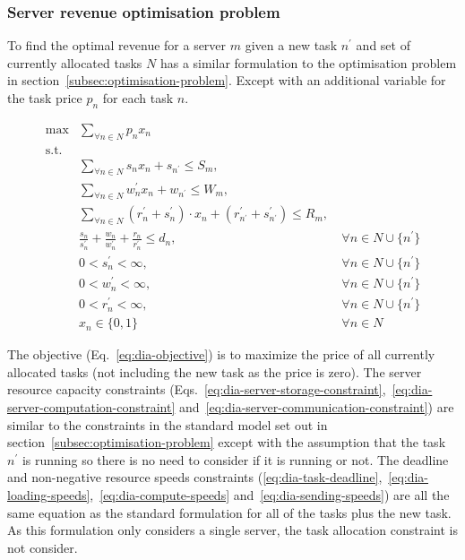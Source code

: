 \subsubsection{Server revenue optimisation problem}\label{subsubsec:decentralised-iterative-problem}
To find the optimal revenue for a server $m$ given a new task $n^{'}$ and set of currently allocated tasks $N$ has a
similar formulation to the optimisation problem in section~\ref{subsec:optimisation-problem}. Except with an additional
variable for the task price $p_n$ for each task $n$.

\begin{align}
    \max & \sum_{\forall n \in N} p_n x_n\label{eq:dia-objective}\\
    \mbox{s.t.} \nonumber \\
    & \sum_{\forall n \in N} s_n x_n + s_{n^{'}} \leq S_m,\label{eq:dia-server-storage-constraint}\\
    & \sum_{\forall n \in N} w^{'}_n x_n + w_{n^{'}} \leq W_m, \label{eq:dia-server-computation-constraint}\\
    & \sum_{\forall n \in N} (r^{'}_n + s^{'}_n) \cdot x_n + (r^{'}_{n^{'}} + s^{'}_{n^{'}}) \leq R_m, \label{eq:dia-server-communication-constraint}\\
    & \frac{s_n}{s^{'}_n} + \frac{w_n}{w^{'}_n} + \frac{r_n}{r^{'}_n} \leq d_n, &~ \forall n \in N \cup \{n^{'}\} \label{eq:dia-task-deadline}\\
    & 0 < s^{'}_n < \infty, &~ \forall{n \in N \cup \{n^{'}\}} \label{eq:dia-loading-speeds}\\
    & 0 < w^{'}_n < \infty, &~ \forall{n \in N \cup \{n^{'}\}} \label{eq:dia-compute-speeds}\\
    & 0 < r^{'}_n < \infty, &~ \forall{n \in N \cup \{n^{'}\}} \label{eq:dia-sending-speeds}\\
    & x_n \in \{0,1\} &~ \forall{n \in N} \label{eq:dia-job-allocation}
\end{align}

The objective (Eq.~\eqref{eq:dia-objective}) is to maximize the price of all currently allocated tasks (not including
the new task as the price is zero). The server resource capacity constraints
(Eqs.~\eqref{eq:dia-server-storage-constraint},~\eqref{eq:dia-server-computation-constraint}
and~\eqref{eq:dia-server-communication-constraint}) are similar to the constraints in the standard model set out in
section~\ref{subsec:optimisation-problem} except with the assumption that the task $n^{'}$ is running so there is no
need to consider if it is running or not. The deadline and non-negative resource speeds constraints
(\ref{eq:dia-task-deadline},~\ref{eq:dia-loading-speeds},~\ref{eq:dia-compute-speeds} and~\ref{eq:dia-sending-speeds})
are all the same equation as the standard formulation for all of the tasks plus the new task. As this formulation only
considers a single server, the task allocation constraint is not consider.

